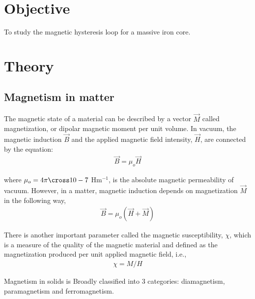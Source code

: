 \section{Objective}
To study the magnetic hysteresis loop for a  massive iron core.

\section{Theory}
\subsection*{Magnetism in matter}

The magnetic state of a material can be described by a vector $\vec{M}$
called magnetization, or dipolar magnetic moment per unit volume. In vacuum, the magnetic
induction $\vec{B}$ and the applied magnetic field intensity, $\vec{H}$, are connected by the equation:
\begin{align}
    \vec{B} = \mu_o\vec{H}
\end{align}

where $\mu_o = 4\pi \cross 10-7$ Hm$^{-1}$, is the absolute magnetic permeability of vacuum. However, in a matter, magnetic induction depends on magnetization $\vec{M}$ in the following way,
\begin{align}
    \vec{B} = \mu_o(\vec{H} + \vec{M})
\end{align}

There is another important parameter called the magnetic susceptibility, $\chi$, which is a
measure of the quality of the magnetic material and defined as the magnetization produced
per unit applied magnetic field, i.e.,
\begin{align}
    \chi = M/H
\end{align}

Magnetism in solids is Broadly classified into 3 categories: diamagnetism, paramagnetism and ferromagnetism.

